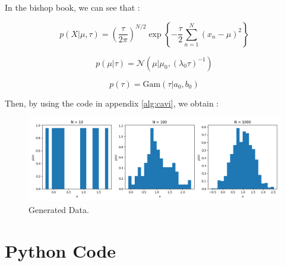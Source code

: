 \documentclass{article}
\begin{document}
In the bishop book, we can see that :

\begin{equation}
    p(X|\mu, \tau) = \left(\frac{\tau}{2\pi}\right)^{N/2} \exp\left\{-\frac{\tau}{2}\sum_{n=1}^{N}(x_n - \mu)^2\right\}
\end{equation}

\begin{equation}
    p(\mu|\tau) = \mathcal{N}(\mu|\mu_0, (\lambda_0 \tau)^{-1})
\end{equation}

\begin{equation}
    p(\tau) = \text{Gam}(\tau|a_0, b_0)
\end{equation}

Then, by using the code in appendix \ref{alg:cavi}, we obtain :

\begin{figure}[H]
    \centering
    \includegraphics[scale=0.5]{py_files/12_data.png}
    \caption{Generated Data.}
    \label{fig:3.12}
\end{figure}

\newpage
\appendix
\section{Python Code}\label{appendix:code}


\end{document}
